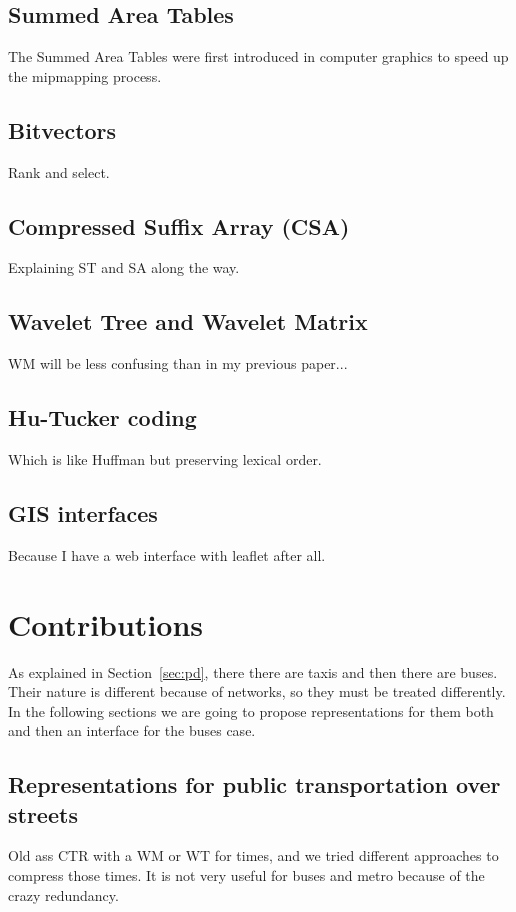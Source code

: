 \documentclass{UniVieCS_PhD} %
\begin{document}
	\subsection{Summed Area Tables}
	The Summed Area Tables were first introduced in computer graphics \cite{crow1984summed} to speed up the mipmapping process.
	
	\subsection{Bitvectors}
	Rank and select.
	
	\subsection{Compressed Suffix Array (CSA)}
	Explaining ST and SA along the way.
	
	\subsection{Wavelet Tree and Wavelet Matrix}
	WM will be less confusing than in my previous paper...
	
	\subsection{Hu-Tucker coding}
	Which is like Huffman but preserving lexical order.
	
	\subsection{GIS interfaces}
	Because I have a web interface with leaflet after all.
	
	
	\section{Contributions}
	As explained in Section~\ref{sec:pd}, there there are taxis and then there are buses. Their nature is different because of networks, so they must be treated differently. In the following sections we are going to propose representations for them both and then an interface for the buses case.
	
	\subsection{Representations for public transportation over streets}
	Old ass CTR \cite{brisaboa2018compact} with a WM or WT for times, and we tried different approaches to compress those times. It is not very useful for buses and metro because of the crazy redundancy.
	
\end{document}
